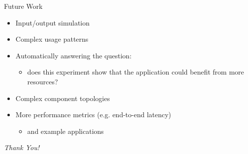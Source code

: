 \documentclass{beamer}
\begin{document}
\begin{frame}{Future Work}
  \begin{itemize}
  \item Input/output simulation
  \item Complex usage patterns
  \item Automatically answering the question:
    \begin{itemize}
    \item does this experiment show that the application could benefit from more
      resources?
    \end{itemize}
  \item Complex component topologies
  \item More performance metrics (e.g. end-to-end latency)
    \begin{itemize}
    \item and example applications
    \end{itemize}
  \end{itemize}
  \pause
  \vfill
  \centering
  \large
  \emph{Thank You!}
\end{frame}

\end{document}
